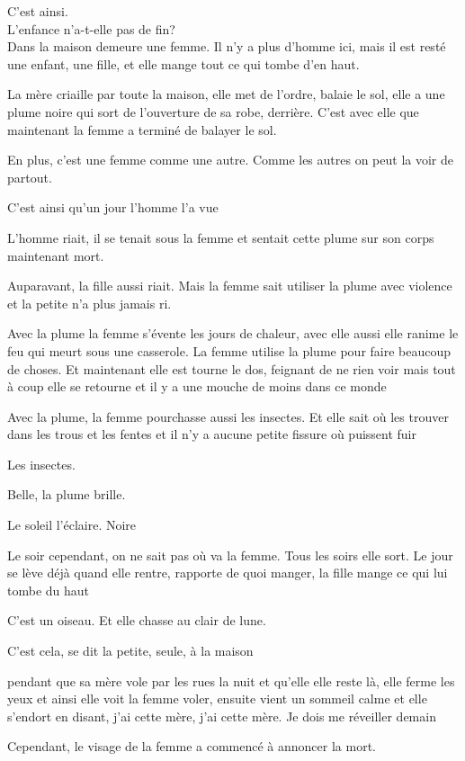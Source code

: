 C'est ainsi.\\

L'enfance n'a-t-elle pas de fin?\\

Dans la maison demeure une femme. Il n'y a plus d'homme ici, mais il est
resté une enfant, une fille, et elle mange tout ce qui tombe d'en haut.

La mère criaille par toute la maison, elle met de l'ordre, balaie le
sol, elle a une plume noire qui sort de l'ouverture de sa robe,
derrière. C'est avec elle que maintenant la femme a terminé de balayer
le sol.

En plus, c'est une femme comme une autre. Comme les autres on peut la
voir de partout.

C'est ainsi qu'un jour l'homme l'a vue

L'homme riait, il se tenait sous la femme et sentait cette plume sur son
corps maintenant mort.

Auparavant, la fille aussi riait. Mais la femme sait utiliser la plume
avec violence et la petite n'a plus jamais ri.

Avec la plume la femme s'évente les jours de chaleur, avec elle aussi
elle ranime le feu qui meurt sous une casserole. La femme utilise la
plume pour faire beaucoup de choses. Et maintenant elle est tourne le
dos, feignant de ne rien voir mais tout à coup elle se retourne et il y
a une mouche de moins dans ce monde

Avec la plume, la femme pourchasse aussi les insectes. Et elle sait où
les trouver dans les trous et les fentes et il n'y a aucune petite
fissure où puissent fuir

Les insectes.

Belle, la plume brille.

Le soleil l'éclaire. Noire

Le soir cependant, on ne sait pas où va la femme. Tous les soirs elle
sort. Le jour se lève déjà quand elle rentre, rapporte de quoi manger,
la fille mange ce qui lui tombe du haut

C'est un oiseau. Et elle chasse au clair de lune.

C'est cela, se dit la petite, seule, à la maison

pendant que sa mère vole par les rues la nuit et qu'elle elle reste là,
elle ferme les yeux et ainsi elle voit la femme voler, ensuite vient un
sommeil calme et elle s'endort en disant, j'ai cette mère, j'ai cette
mère. Je dois me réveiller demain

Cependant, le visage de la femme a commencé à annoncer la mort.

